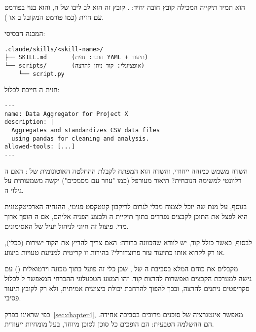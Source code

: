  הוא תמיד תיקייה המכילה קובץ חובה יחיד: . קובץ זה הוא לב ליבו של ה, והוא בנוי בפורמט  עם חזית  (כמו פורמט  המקובל ב או ).

המבנה הבסיסי:

\begin{verbatim}
.claude/skills/<skill-name>/
├── SKILL.md       (חובה: חזית YAML + תיעוד)
└── scripts/       (אופציונלי: קוד ניתן להרצה)
    └── script.py
\end{verbatim}

חזית ה חייבת לכלול:

\begin{verbatim}
---
name: Data Aggregator for Project X
description: |
  Aggregates and standardizes CSV data files
  using pandas for cleaning and analysis.
allowed-tools: [...]
---
\end{verbatim}

השדה  משמש כמזהה ייחודי, והשדה  הוא המפתח לקבלת ההחלטה האוטונומית של : האם ה רלוונטי למשימה הנוכחית? תיאור מעורפל (כמו "עוזר עם מסמכים") יקשה משמעותית על גילוי ה\cite{anthropic2025invocation}.

בנוסף, על מנת שה יוכל לצמוח מבלי לגרום לריקבון קונטקסט פנימי, ההנחיה הארכיטקטונית היא לפצל את התוכן לקבצים נפרדים בתוך תיקיית ה ולבצע הפניה אליהם, אם ה הופך ארוך מדי. פיצול זה חיוני לניהול יעיל של האסימונים.

לבסוף, כאשר  כולל קוד, יש לוודא שהכוונה ברורה: האם  צריך להריץ את הקוד ישירות (ככלי), או רק לקרוא אותו כתיעוד עזר פרוצדורלי? בהירות זו קריטית למניעת טעויות ביצוע.

 מקבלים את כוחם המלא בסביבת ה של \cite{anthropic2025claudecli}, שכן כלי זה פועל בתוך מכונה וירטואלית () עם גישה למערכת הקבצים ואפשרות להרצת קוד. זהו המצע הטכנולוגי ההכרחי המאפשר ל לכלול סקריפטים ניתנים להרצה, ובכך להפוך להרחבת יכולת ביצועית אמיתית, ולא רק לקובץ תיעוד פסיבי.

כפי שראינו בפרק~\ref{sec:chapter4},  מאפשר אינטגרציה של סוכנים מרובים בסביבה אחידה.  הם ההשלמה הטבעית: הם הופכים כל סוכן לסוכן מיוחד, בעל מומחיות ייעודית.
